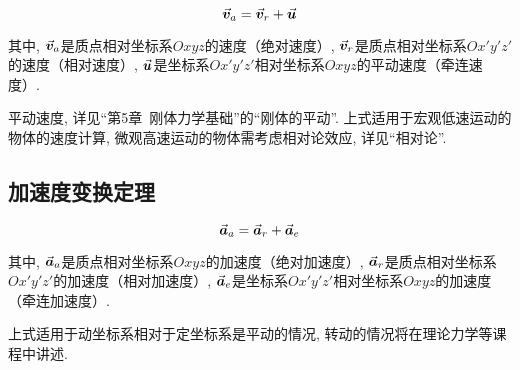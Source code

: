 \begin{equation}
	\va*{v}_a = \va*{v}_r + \va*{u} \label{C1-eq30}
\end{equation}

其中, $\va*{v}_a$是质点相对坐标系$Oxyz$的速度（绝对速度）, $\va*{v}_r$是质点相对坐标系$Ox'y'z'$的速度（相对速度）, $\va*{u}$是坐标系$Ox'y'z'$相对坐标系$Oxyz$的平动速度（牵连速度）. 

\begin{note}
	
	平动速度, 详见“第5章\ {}刚体力学基础”的“刚体的平动”. 上式适用于宏观低速运动的物体的速度计算, 微观高速运动的物体需考虑相对论效应, 详见“相对论”. 
	
\end{note}

\subsection{加速度变换定理}

\begin{equation}
	\va*{a}_a = \va*{a}_r + \va*{a}_e \label{C1-eq31}
\end{equation}

其中, $\va*{a}_a$是质点相对坐标系$Oxyz$的加速度（绝对加速度）, $\va*{a}_r$是质点相对坐标系$Ox'y'z'$的加速度（相对加速度）, $\va*{a}_e$是坐标系$Ox'y'z'$相对坐标系$Oxyz$的加速度（牵连加速度）. 

\begin{note}
	
	上式适用于动坐标系相对于定坐标系是平动的情况, 转动的情况将在理论力学等课程中讲述. 
	
\end{note}

\newpage
